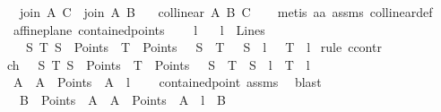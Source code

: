 \begin{isabellebody}
\ \ \ {\isachardoublequoteopen}join\ A\ C\ {\isacharequal}{\kern0pt}\ join\ A\ B{\isachardoublequoteclose}\isanewline
\ \ \ {\isachardoublequoteopen}collinear\ A\ B\ C{\isachardoublequoteclose}\isanewline
%
\isadelimproof
\ \ %
\endisadelimproof
%
\isatagproof
{}\isamarkupfalse%
\ {\isacharparenleft}{\kern0pt}metis\ a{}a\ assms{\isacharparenleft}{\kern0pt}{}{\isacharcomma}{\kern0pt}{}{\isacharcomma}{\kern0pt}{}{\isacharparenright}{\kern0pt}\ collinear{\isacharunderscore}{\kern0pt}def{\isacharparenright}{\kern0pt}%
\endisatagproof
{\isafoldproof}%
%
\isadelimproof
\isanewline
%
\endisadelimproof
\isanewline
{}\isamarkupfalse%
\ {\isacharparenleft}{\kern0pt}\ affine{\isacharunderscore}{\kern0pt}plane{\isacharparenright}{\kern0pt}\ contained{\isacharunderscore}{\kern0pt}points{\isacharcolon}{\kern0pt}\ \isanewline
\ \ \ l\isanewline
\ \ \ {\isachardoublequoteopen}l\ {\isasymin}\ Lines{\isachardoublequoteclose}\isanewline
\ \ \ {\isachardoublequoteopen}{\isasymexists}\ S\ T{\isachardot}{\kern0pt}\ S\ {\isasymin}\ Points\ {\isasymand}\ T\ {\isasymin}\ Points\ {\isasymand}\ \ S\ {\isasymnoteq}\ T\ {\isasymand}\ \ S\ {\isasymlhd}\ l\ {\isasymand}\ \ T\ {\isasymlhd}\ l{\isachardoublequoteclose}\isanewline
%
\isadelimproof
%
\endisadelimproof
%
\isatagproof
{}\isamarkupfalse%
\ {\isacharparenleft}{\kern0pt}rule\ ccontr{\isacharparenright}{\kern0pt}\isanewline
\ \ \isamarkupfalse%
\ ch{\isacharcolon}{\kern0pt}\ {\isachardoublequoteopen}{\isasymnot}\ {\isacharparenleft}{\kern0pt}{\isasymexists}\ S\ T{\isachardot}{\kern0pt}\ S\ {\isasymin}\ Points\ {\isasymand}\ T\ {\isasymin}\ Points\ {\isasymand}\ \ S\ {\isasymnoteq}\ T\ {\isasymand}\ S\ {\isasymlhd}\ l\ {\isasymand}\ T\ {\isasymlhd}\ l{\isacharparenright}{\kern0pt}{\isachardoublequoteclose}\isanewline
\ \ \isamarkupfalse%
\ {}{\isacharcolon}{\kern0pt}\ {\isachardoublequoteopen}{\isacharbraceleft}{\kern0pt}A\ {\isachardot}{\kern0pt}\ A\ {\isasymin}\ Points\ {\isasymand}\ A\ {\isasymlhd}\ l{\isacharbraceright}{\kern0pt}\ {\isasymnoteq}\ {\isacharbraceleft}{\kern0pt}{\isacharbraceright}{\kern0pt}{\isachardoublequoteclose}\ \isamarkupfalse%
\ contained{\isacharunderscore}{\kern0pt}point\ assms\ \isamarkupfalse%
\ blast\isanewline
\ \ \isamarkupfalse%
\ {}{\isacharcolon}{\kern0pt}\ {\isachardoublequoteopen}{\isasymexists}\ B\ {\isasymin}\ Points\ {\isachardot}{\kern0pt}\ {\isacharbraceleft}{\kern0pt}A\ {\isachardot}{\kern0pt}\ A\ {\isasymin}\ Points\ {\isasymand}\ A\ {\isasymlhd}\ l{\isacharbraceright}{\kern0pt}\ {\isacharequal}{\kern0pt}\ {\isacharbraceleft}{\kern0pt}B{\isacharbraceright}{\kern0pt}{\isachardoublequoteclose}\ \isamarkupfalse%

\end{isabellebody}
